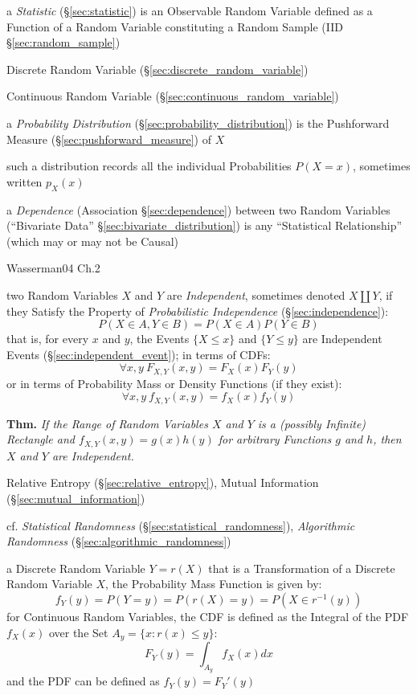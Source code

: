 \fist a \emph{Statistic} (\S\ref{sec:statistic}) is an Observable Random
Variable defined as a Function of a Random Variable constituting a Random Sample
(IID \S\ref{sec:random_sample})

Discrete Random Variable (\S\ref{sec:discrete_random_variable})

Continuous Random Variable (\S\ref{sec:continuous_random_variable})

a \emph{Probability Distribution} (\S\ref{sec:probability_distribution})
is the Pushforward Measure (\S\ref{sec:pushforward_measure}) of $X$

such a distribution records all the individual Probabilities $P(X = x)$,
sometimes written $p_X(x)$

a \emph{Dependence} (Association \S\ref{sec:dependence}) between two Random
Variables (``Bivariate Data'' \S\ref{sec:bivariate_distribution}) is any
``Statistical Relationship'' (which may or may not be Causal)

Wasserman04 Ch.2

two Random Variables $X$ and $Y$ are \emph{Independent}, sometimes denoted
$X \coprod Y$, if they Satisfy the Property of \emph{Probabilistic Independence}
(\S\ref{sec:independence}):
\[
  P(X \in A, Y \in B) = P(X \in A) P(Y \in B)
\]
that is, for every $x$ and $y$, the Events $\{X \leq x\}$ and $\{Y \leq y\}$ are
Independent Events (\S\ref{sec:independent_event}); in terms of CDFs:
\[
  \forall x,y\ F_{X,Y}(x,y) = F_X(x)F_Y(y)
\]
or in terms of Probability Mass or Density Functions (if they exist):
\[
  \forall x,y\ f_{X,Y}(x,y) = f_X(x)f_Y(y)
\]

\textbf{Thm.} \emph{If the Range of Random Variables $X$ and $Y$ is a (possibly
  Infinite) Rectangle and $f_{X,Y}(x,y) = g(x)h(y)$ for arbitrary Functions $g$
  and $h$, then $X$ and $Y$ are Independent.}

\fist Relative Entropy (\S\ref{sec:relative_entropy}), Mutual Information
(\S\ref{sec:mutual_information})

cf. \emph{Statistical Randomness} (\S\ref{sec:statistical_randomness}),
\emph{Algorithmic Randomness} (\S\ref{sec:algorithmic_randomness})

a Discrete Random Variable $Y = r(X)$ that is a Transformation of a Discrete
Random Variable $X$, the Probability Mass Function is given by:
\[
  f_Y(y) = P(Y = y) = P(r(X) = y) = P(X \in r^{-1}(y))
\]
for Continuous Random Variables, the CDF is defined as the Integral of the PDF
$f_X(x)$ over the Set $A_y = \{x : r(x) \leq y\}$:
\[
  F_Y(y) = \int_{A_y} f_X(x) dx
\]
and the PDF can be defined as $f_Y(y) = F_Y'(y)$

